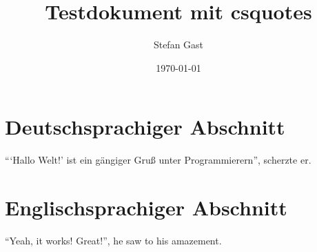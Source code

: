 \documentclass{scrartcl}
\title{Testdokument mit csquotes}
\author{Stefan Gast}
\date{\today}
\begin{document}
	\maketitle

	\section{Deutschsprachiger Abschnitt}
		\enquote{\enquote{Hallo Welt!} ist ein gängiger Gruß unter Programmierern}, scherzte er.

	\section{Englischsprachiger Abschnitt}
		\begin{otherlanguage}{english}
			\enquote{Yeah, it works! Great!}, he saw to his amazement.
		\end{otherlanguage}
\end{document}
